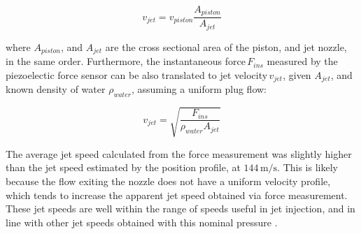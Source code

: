             \begin{equation}
            v_{jet}=v_{piston} \frac{A_{piston}}{A_{jet}}
            \label{eq:chap/validation/injection_test/v_jet estimated from area}
            \end{equation}
            
            where $A_{piston}$, and $A_{jet}$ are the cross sectional area of the piston, and jet nozzle, in the same order. Furthermore, the instantaneous force\,$F_{ins}$ measured by the piezoelectic force sensor can be also translated to jet velocity\,$v_{jet}$, given $A_{jet}$, and known density of water $\rho_{water}$, assuming a uniform plug flow: 
            
            \begin{equation}
            v_{jet}=\sqrt{\frac{F_{ins}}{\rho_{water}A_{jet}}}
            \label{eq:chap/validation/injection_test/v_jet estimated from force}
            \end{equation}
            
            The average jet speed calculated from the force measurement was slightly higher than the jet speed estimated by the position profile, at $144\,\mathrm{m/s}$. This is likely because the flow exiting the nozzle does not have a uniform velocity profile, which tends to increase the apparent jet speed obtained via force measurement. These jet speeds are well within the range of speeds useful in jet injection, and in line with other jet speeds obtained with this nominal pressure \cite{Williams2016}.


